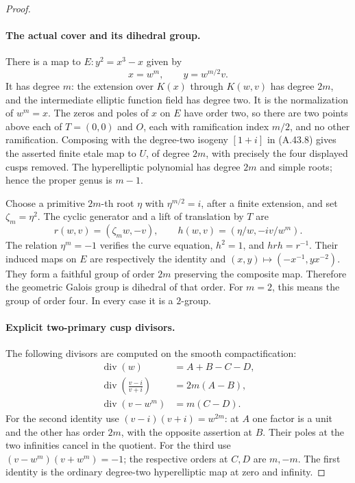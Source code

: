 \begin{proof}
\paragraph{The actual cover and its dihedral group.}
There is a map to \(E:y^2=x^3-x\) given by
\[
                 x=w^m,\qquad y=w^{m/2}v.            \tag{A.44.3}
\]
It has degree \(m\): the extension over \(K(x)\)
through \(K(w,v)\) has degree \(2m\), and the
intermediate elliptic function field has degree two.
It is the normalization of \(w^m=x\). The zeros
and poles of \(x\) on \(E\) have order two, so
there are two points above each of \(T=(0,0)\) and
\(O\), each with ramification index \(m/2\), and
no other ramification. Composing with the degree-two
isogeny \([1+i]\) in (A.43.8) gives the asserted
finite etale map to \(U\), of degree \(2m\),
with precisely the four displayed cusps removed.
The hyperelliptic polynomial has degree \(2m\) and
simple roots; hence the proper genus is \(m-1\).

Choose a primitive \(2m\)-th root \(\eta\) with
\(\eta^{m/2}=i\), after a finite extension, and set
\(\zeta_m=\eta^2\). The cyclic generator and a
lift of translation by \(T\) are
\[
 r(w,v)=(\zeta_m w,-v),
 \qquad h(w,v)=(\eta/w,-i v/w^m).                   \tag{A.44.4}
\]
The relation \(\eta^m=-1\) verifies the curve
equation, \(h^2=1\), and \(hrh=r^{-1}\).
Their induced maps on \(E\) are respectively the
identity and \((x,y)\mapsto(-x^{-1},yx^{-2})\).
They form a faithful group of order \(2m\) preserving
the composite map. Therefore the geometric Galois group
is dihedral of that order. For \(m=2\), this means
the group of order four. In every case it is a
\(2\)-group.

\paragraph{Explicit two-primary cusp divisors.}
The following divisors are computed on the smooth
compactification:
\[
 \begin{split}
 \operatorname{div}(w)&=A+B-C-D,\\
 \operatorname{div}\left(\frac{v-i}{v+i}\right)&=2m(A-B),\\
 \operatorname{div}(v-w^m)&=m(C-D).
 \end{split}                                       \tag{A.44.5}
\]
For the second identity use
\((v-i)(v+i)=w^{2m}\): at \(A\) one factor
is a unit and the other has order \(2m\), with
the opposite assertion at \(B\). Their poles at
the two infinities cancel in the quotient. For the
third use \((v-w^m)(v+w^m)=-1\); the respective
orders at \(C,D\) are \(m,-m\).
The first identity is the ordinary degree-two
hyperelliptic map at zero and infinity.


\end{proof}
